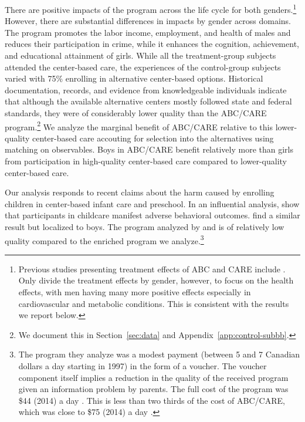 There are positive impacts of the program across the life cycle for both genders.\footnote{Previous studies presenting treatment effects of ABC and CARE include \citet{Ramey_etal_1985_Project-CARE_TiECSE,Clarke_Campbell_1998_ABC_Comparison_ECRQ,Campbell_Pungello_etal_2001_DP,Campbell_Ramey_etal_2002_ADS,Campbell_Wasik_etal_2008_ECRQ,Campbell_Conti_etal_2014_EarlyChildhoodInvestments}. Only \citet{Campbell_Conti_etal_2014_EarlyChildhoodInvestments} divide the treatment effects by gender, however, to focus on the health effects, with men having many more positive effects especially in cardiovascular and metabolic conditions. This is consistent with the results we report below.} However, there are substantial differences in impacts by gender across domains. The program promotes the labor income, employment, and health of males and reduces their participation in crime, while it enhances the cognition, achievement, and educational attainment of girls. While all the treatment-group subjects attended the center-based care, the experiences of the control-group subjects varied with 75\% enrolling in alternative center-based options. Historical documentation, records, and evidence from knowledgeable individuals indicate that although the available alternative centers mostly followed state and federal standards, they were of considerably lower quality than the ABC/CARE program.\footnote{We document this in Section~\ref{sec:data} and Appendix~\ref{app:control-subbb}.} We analyze the marginal benefit of ABC/CARE relative to this lower-quality center-based care accouting for selection into the alternatives using matching on observables. Boys in ABC/CARE benefit relatively more than girls from participation in high-quality center-based care compared to lower-quality center-based care.

Our analysis responds to recent claims about the harm caused by enrolling children in center-based infant care and preschool. In an influential analysis, \citet{Baker_Gruber_etal_2008_JPE} show that participants in childcare manifest adverse behavioral outcomes. \citet{Kottelenberg_Lehrer_2014_Gender-Effects} find a similar result but localized to boys.  The program analyzed by \citet{Baker_Gruber_Milligan_2015_Noncog_Defects} and \citet{Kottelenberg_Lehrer_2014_Gender-Effects} is of relatively low quality compared to the enriched program we analyze.\footnote{The program they analyze was a modest payment (between 5 and 7 Canadian dollars a day starting in 1997) in the form of a voucher. The voucher component itself implies a reduction in the quality of the received program given an information problem by parents. The full cost of the program was \$44 (2014) a day \citep{Baker_etal_2005_Universal_Childcare_NBER}. This is less than two thirds of the cost of ABC/CARE, which was close to \$75 (2014) a day \citep{Garcia_Heckman_Leaf_etal_2017_Comp_CBA_Unpublished}.}  

